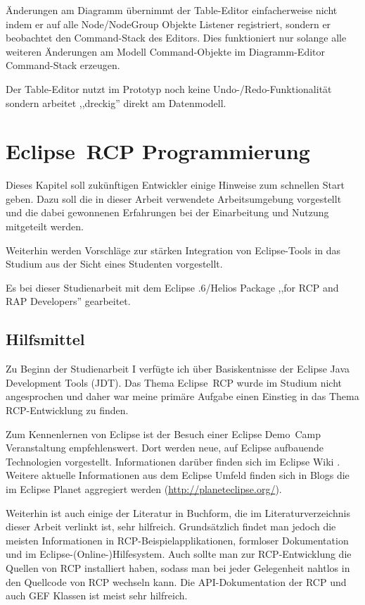 \documentclass[%
12pt,titlepage,abstracton,DIV=10,BCOR=0.5cm]{scrreprt}
\begin{document}
Änderungen am Diagramm übernimmt der Table-Editor einfacherweise nicht indem er
auf alle Node/NodeGroup Objekte Listener registriert, sondern er beobachtet den
Command-Stack des Editors. Dies funktioniert nur solange alle weiteren
Änderungen am Modell Command-Objekte im Diagramm-Editor Command-Stack erzeugen.

Der Table-Editor nutzt im Prototyp noch keine Undo-/Redo-Funktionalität sondern
arbeitet ,,dreckig'' direkt am Datenmodell.

\chapter{Eclipse~RCP Programmierung}\label{chapter:rcpprogrammierung}
Dieses Kapitel soll zukünftigen Entwickler einige Hinweise zum schnellen Start
geben. Dazu soll die in dieser Arbeit verwendete Arbeitsumgebung vorgestellt und
die dabei gewonnenen Erfahrungen bei der Einarbeitung und Nutzung mitgeteilt
werden.

Weiterhin werden Vorschläge zur stärken Integration von Eclipse-Tools in das
Studium aus der Sicht eines Studenten vorgestellt.

Es bei dieser Studienarbeit mit dem Eclipse .6/Helios Package
,,for RCP and RAP Developers'' gearbeitet.

\section{Hilfsmittel}
Zu Beginn der Studienarbeit I verfügte ich über Basiskentnisse der Eclipse
Java Development Tools (JDT). Das Thema Eclipse~RCP wurde im Studium nicht
angesprochen und daher war meine primäre Aufgabe einen Einstieg in das Thema
RCP-Entwicklung zu finden.

Zum Kennenlernen von Eclipse ist der Besuch einer Eclipse Demo~Camp
Veranstaltung empfehlenswert. Dort werden neue, auf Eclipse aufbauende
Technologien vorgestellt. Informationen darüber finden sich im Eclipse Wiki
\cite{eclipse:wiki}. Weitere aktuelle Informationen aus dem Eclipse Umfeld
finden sich in Blogs die im Eclipse Planet aggregiert werden
(\url{http://planeteclipse.org/}).

Weiterhin ist auch einige der Literatur in Buchform, die im Literaturverzeichnis
dieser Arbeit verlinkt ist, sehr hilfreich. Grundsätzlich findet man jedoch die
meisten Informationen in RCP-Beispielapplikationen, formloser Dokumentation und
im Eclipse-(Online-)Hilfesystem. Auch sollte man zur RCP-Entwicklung die Quellen
von RCP installiert haben, sodass man bei jeder Gelegenheit nahtlos in den
Quellcode von RCP wechseln kann. Die API-Dokumentation der RCP und auch GEF
Klassen ist meist sehr hilfreich.
\end{document}

